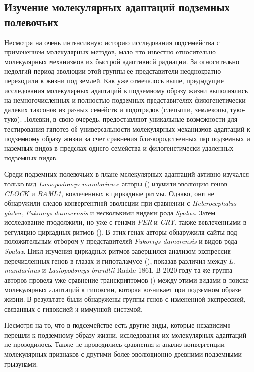 \subsection{Изучение молекулярных адаптаций подземных полевочьих}

Несмотря на очень интенсивную историю исследования подсемейства с применением молекулярных методов, мало что известно относительно молекулярных механизмов их быстрой адаптивной радиации. За относительно недолгий период эволюции этой группы ее представители неоднократно переходили к жизни под землей. Как уже отмечалось выше, предыдущие исследования молекулярных адаптаций к подземному образу жизни выполнялись на немногочисленных и полностью подземных представителях филогенетически далеких таксонов из разных семейств и подотрядов (слепыши, землекопы, туко-туко). Полевки, в свою очередь, предоставляют уникальные возможности для тестирования гипотез об универсальности молекулярных механизмов адаптаций к подземному образу жизни за счет сравнения близкородственных пар подземных и наземных видов в пределах одного семейства и филогенетически удаленных подземных видов. 

Среди подземных полевочьих в плане молекулярных адаптаций активно изучался только вид \textit{Lasiopodomys mandarinus}: авторы (\cite{Sun2018a}) изучили эволюцию генов \textit{CLOCK} и \textit{BAML1}, вовлеченных в циркадные ритмы. Однако, они не обнаружили следов конвергентной эволюции при сравнении с \textit{Heterocephalus glaber}, \textit{Fukomys damarensis} и несколькими видами рода \textit{Spalax}. Затем исследование продолжили, но уже с генами \textit{PER} и \textit{CRY}, также вовлеченными в регуляцию циркадных ритмов (\cite{Sun2018}). В этих генах авторы обнаружили сайты под положительным отбором у представителей \textit{Fukomys damarensis} и видов рода \textit{Spalax}. Цикл изучения циркадных ритмов завершился анализом экспрессии перечисленных генов в глазах и гипоталамусе (\cite{Sun2020}), показав различия между \textit{L. mandarinus} и \textit{Lasiopodomys brandtii} Radde 1861. В 2020 году та же группа авторов провела уже сравнение транскриптомов (\cite{Dong2020}) между этими видами в поиске молекулярных адаптаций к гипоксии, которая возникает при подземном образе жизни. В результате были обнаружены группы генов с измененной экспрессией, связанных с гипоксией и иммунной системой. 

Несмотря на то, что в подсемействе есть другие виды, которые независимо перешли к подземному образу жизни, исследования их молекулярных адаптаций не проводилось. Также не проводились сравнения и анализ конвергенции молекулярных признаков с другими более эволюционно древними подземными грызунами.
 